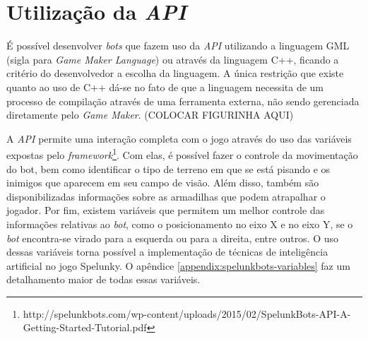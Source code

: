 \section{Utilização da \textit{API}}

É possível desenvolver \textit{bots} que fazem uso da \textit{API}
utilizando a linguagem GML (sigla para \textit{Game Maker Language}) ou
através da linguagem C++, ficando a critério do desenvolvedor a escolha da
linguagem. A única restrição que existe quanto ao uso de C++ dá-se no fato
de que a linguagem necessita de um processo de compilação através de uma
ferramenta externa, não sendo gerenciada diretamente pelo \textit{Game
Maker}. (COLOCAR FIGURINHA AQUI)

A \textit{API} permite uma interação completa com o jogo através do uso
das variáveis expostas pelo
\textit{framework}\footnote{http://spelunkbots.com/wp-content/uploads/2015/02/SpelunkBots-API-A-Getting-Started-Tutorial.pdf}.
Com elas, é possível fazer o controle da movimentação do bot, bem
como identificar o tipo de terreno em que se está pisando e os inimigos que
aparecem em seu campo de visão. Além disso, também são disponibilizadas
informações sobre as armadilhas que podem atrapalhar o jogador. Por fim,
existem variáveis que permitem um melhor controle das informações relativas ao
\textit{bot}, como o posicionamento no eixo X e no eixo Y, se o \textit{bot}
encontra-se virado para a esquerda ou para a direita, entre outros. O uso dessas
variáveis torna possível a implementação de técnicas de inteligência artificial
no jogo Spelunky. O apêndice \ref{appendix:spelunkbots-variables} faz um
detalhamento maior de todas essas variáveis.

